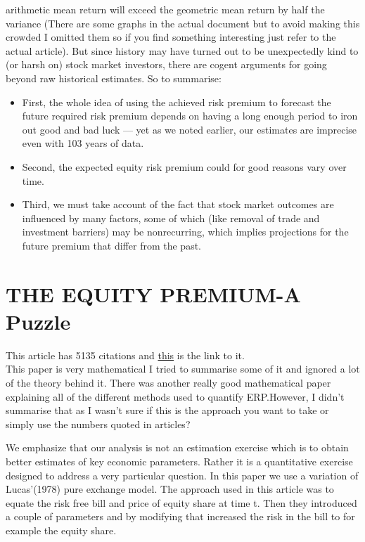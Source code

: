 \documentclass[12 pt]{article}
\begin{document}
arithmetic mean return will exceed the geometric mean return by half the variance (There are some graphs in the actual document but to avoid making this crowded I omitted them so if you find something interesting just refer to the actual article). But since history may have turned out to be unexpectedly kind to (or harsh on) stock market investors, there are cogent arguments for going beyond raw historical estimates. So to summarise:
\begin{itemize}
\item First, the whole idea of using the achieved risk premium to forecast the future required risk premium depends on having a long enough period to iron out good and bad luck — yet as we noted earlier, our estimates are imprecise even with 103 years of data.
\item Second, the expected equity risk premium could for good reasons vary over time. 
\item Third, we must take account of the fact that stock market outcomes are influenced by many factors, some of which (like removal of trade and investment barriers) may be nonrecurring, which implies projections for the future premium that differ from the past.
\end{itemize}
\section{THE EQUITY PREMIUM-A Puzzle}
This article has 5135 citations and \href{http://www.sciencedirect.com/science/article/pii/0304393285900613}{this} is the link to it.\\
This paper is very mathematical I tried to summarise some of it and ignored a lot of the theory behind it. There was another really good mathematical paper explaining all of the different methods used to quantify ERP.However, I didn't summarise that as I wasn't sure if this is the approach you want to take or simply use the numbers quoted in articles? 

\par We emphasize that our analysis is not an estimation exercise which is to obtain better estimates of key economic parameters. Rather it is a quantitative exercise designed to address a very particular question. In this paper we use a variation of Lucas'(1978) pure exchange model. The approach used in this article was to equate the risk free bill and price of equity share at time t. Then they introduced a couple of parameters and by modifying that increased the risk in the bill to for example the equity share. 
\end{document}
